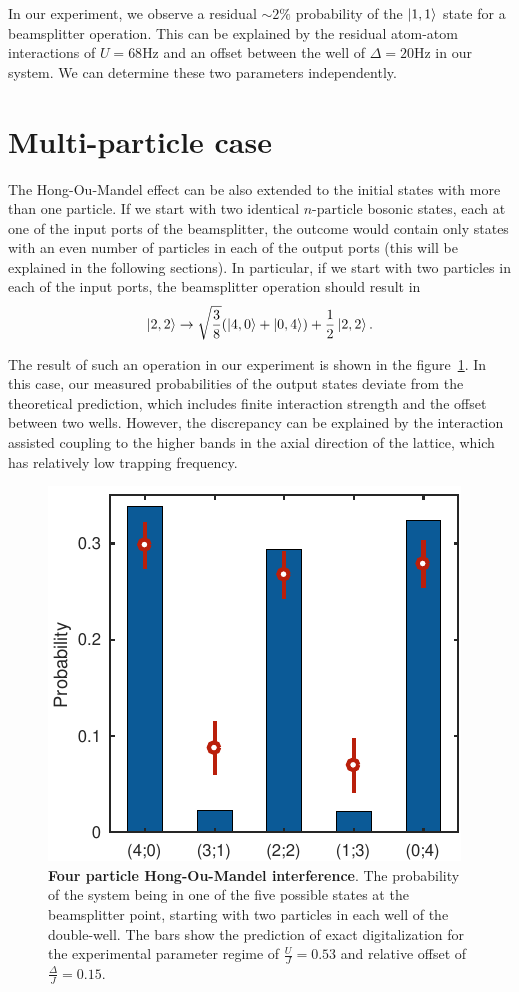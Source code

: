 In our experiment, we observe a residual $\sim 2\%$ probability of the $\left|1,1\right\rangle$ state for a beamsplitter operation. This can be explained by the residual atom-atom interactions of $U=68\textrm{Hz}$ and an offset between the well of $\Delta = 20\textrm{Hz}$ in our system. We can determine these two parameters independently.

\section{Multi-particle case}
The Hong-Ou-Mandel effect can be also extended to the initial states with more than one particle. If we start with two identical $n\textrm{-particle}$ bosonic states, each at one of the input ports of the beamsplitter, the outcome would contain only states with an even number of particles in each of the output ports (this will be explained in the following sections). In particular, if we start with two particles in each of the input ports, the beamsplitter operation should result in
\begin{equation}
\left|2,2\right\rangle\rightarrow \sqrt{\frac{3}{8}}(\left|4,0\right\rangle+\left|0,4\right\rangle)+\frac{1}{2} \left|2,2\right\rangle.
\end{equation}

The result of such an operation in our experiment is shown in the figure~\ref{fig:CBH_4particles}. In this case, our measured probabilities of the output states deviate from the theoretical prediction, which includes finite interaction strength and the offset between two wells. However, the discrepancy can be explained by the interaction assisted coupling to the higher bands in the axial direction of the lattice, which has relatively low trapping frequency.

\begin{figure}[t]
	\centering
	\includegraphics[scale=1]{figures/CBH_HOM_4particles.pdf}
	\caption{{\bf Four particle Hong-Ou-Mandel interference}. The probability of the system being in one of the five possible states at the beamsplitter point, starting with two particles in each well of the double-well. The bars show the prediction of exact digitalization for the experimental parameter regime of $\frac{U}{J}=0.53$ and relative offset of $\frac{\Delta}{J} = 0.15$. }
	\label{fig:CBH_4particles}
\end{figure}

